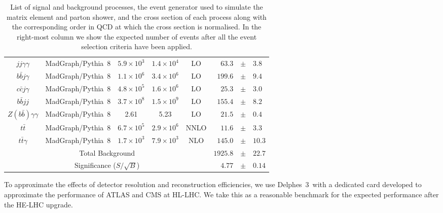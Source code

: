 \begin{table}
\begin{tabular}{|c|c|cc|c|rcl|}
$jj\gamma\gamma$              			& {\sc\small MadGraph}/{\sc\small Pythia~8} 	& $5.9\times 10^{3}$     & $1.4\times 10^{4}$     & LO 					& $63.3$ 		& $\pm$ & $3.8$ \\
$b\bar{b}j\gamma$             			& {\sc\small MadGraph}/{\sc\small Pythia~8} 	& $1.1\times 10^{6}$     & $3.4\times 10^{6}$     & LO 					& $199.6$ 	& $\pm$ & $9.4$ \\
$c\bar{c}j\gamma$             			& {\sc\small MadGraph}/{\sc\small Pythia~8} 	& $4.8\times 10^{5}$     	& $1.6\times 10^{6}$     & LO 				& $25.3$ 		& $\pm$ & $3.0$ \\
$b\bar{b}jj$                  					& {\sc\small MadGraph}/{\sc\small Pythia~8} 	& $3.7\times 10^{8}$     	& $1.5\times 10^{9}$     & LO 				& $155.4$ 	& $\pm$ & $8.2$ \\
$Z(b\bar{b})\gamma\gamma$   		& {\sc\small MadGraph}/{\sc\small Pythia~8} 	& 2.61     			& 5.23      			& LO 											& $21.5$ 		& $\pm$ & $0.4$ \\ \hline
$t\bar{t}$                    					& {\sc\small MadGraph}/{\sc\small Pythia~8} 	& $6.7\times 10^{5}$     	& $2.9\times 10^{6}$     	& NNLO 		& $11.6$ 		& $\pm$ & $3.3$ \\
$t\bar{t}\gamma$              				& {\sc\small MadGraph}/{\sc\small Pythia~8} 	& $1.7\times 10^{3}$     	& $7.9\times 10^{3}$     & NLO 				& $145.0$ 	& $\pm$ & $10.3$ \\ \hline
\multicolumn{5}{|c|}{Total Background}					& $1925.8$ & $\pm$ & $22.7$ \\ \hline
\multicolumn{5}{|c|}{Significance ($S/\sqrt{B}$)}		& $4.77$ & $\pm$ & $0.14$ \\ \hline
\end{tabular}
\caption{List of signal and background processes, the event generator used to simulate the matrix element and parton shower, and the cross section of each process along with the corresponding order in QCD at which the cross section is normalised. In the right-most column we show the expected number of events after all the event selection criteria have been applied.}
\label{t.backgrounds}
\end{table}
\endgroup


To approximate the effects of detector resolution and reconstruction efficiencies, we use {\sc\small Delphes~3}\ with a dedicated card developed to approximate the performance of ATLAS and CMS at HL-LHC. We take this as a reasonable benchmark for the expected performance after the HE-LHC upgrade.

